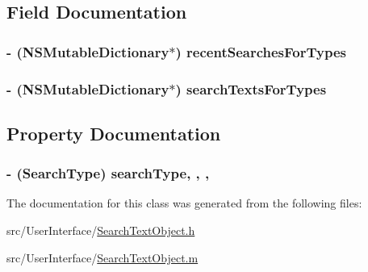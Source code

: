 \subsection{Field Documentation}
\hypertarget{interface_search_text_object_a65254cbf048116b9c6e83c8837f00aa5}{
\subsubsection[{recent\-Searches\-For\-Types}]{\setlength{\rightskip}{0pt plus 5cm}-\/ (N\-S\-Mutable\-Dictionary$\ast$) recent\-Searches\-For\-Types\hspace{0.3cm}{\ttfamily [protected]}}}\label{interface_search_text_object_a65254cbf048116b9c6e83c8837f00aa5}
\hypertarget{interface_search_text_object_abea89e3a5b49f70a84ce07c6afb792c0}{
\subsubsection[{search\-Texts\-For\-Types}]{\setlength{\rightskip}{0pt plus 5cm}-\/ (N\-S\-Mutable\-Dictionary$\ast$) search\-Texts\-For\-Types\hspace{0.3cm}{\ttfamily [protected]}}}\label{interface_search_text_object_abea89e3a5b49f70a84ce07c6afb792c0}


\subsection{Property Documentation}
\hypertarget{interface_search_text_object_ac3a1fa49924063258d425f116eb8b687}{
\subsubsection[{search\-Type}]{\setlength{\rightskip}{0pt plus 5cm}-\/ ({\bf Search\-Type}) search\-Type\hspace{0.3cm}{\ttfamily [read]}, {\ttfamily [write]}, {\ttfamily [atomic]}, {\ttfamily [assign]}}}\label{interface_search_text_object_ac3a1fa49924063258d425f116eb8b687}


The documentation for this class was generated from the following files\-:\begin{DoxyCompactItemize}
\item 
src/\-User\-Interface/\hyperlink{_search_text_object_8h}{Search\-Text\-Object.\-h}\item 
src/\-User\-Interface/\hyperlink{_search_text_object_8m}{Search\-Text\-Object.\-m}\end{DoxyCompactItemize}

